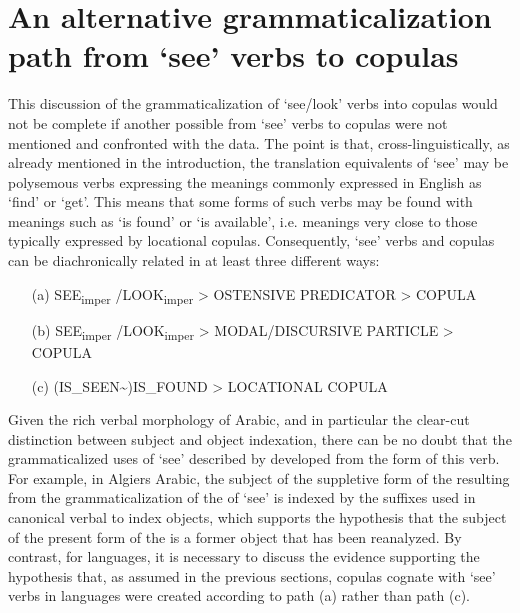 \documentclass[output=paper]{langsci/langscibook}
\begin{document}
\section{An alternative grammaticalization path from ‘see’ verbs to copulas}\label{sec:creissels:7} 

This discussion of the grammaticalization of ‘see\slash look’ verbs into copulas would not be complete if another possible  from ‘see’ verbs to copulas were not mentioned and confronted with the  data. The point is that, cross-linguistically, as already mentioned in the introduction, the translation equivalents of ‘see’ may be polysemous verbs expressing the meanings commonly expressed in English as ‘find’ or ‘get’. This means that some forms of such verbs may be found with meanings such as ‘is found’ or ‘is available’, i.e. meanings very close to those typically expressed by locational copulas. Consequently, ‘see’ verbs and copulas can be diachronically related in at least three different ways:

\begin{itemize}
 \item[(a)] SEE\textsubscript{imper} /LOOK\textsubscript{imper} > OSTENSIVE PREDICATOR > COPULA
 \item[(b)] SEE\textsubscript{imper} /LOOK\textsubscript{imper} > MODAL/DISCURSIVE PARTICLE > COPULA
 \item[(c)] (IS\_SEEN{\textasciitilde})IS\_FOUND > LOCATIONAL COPULA
\end{itemize}

Given the rich verbal morphology of Arabic, and in particular the clear-cut distinction between subject and object indexation, there can be no doubt that the grammaticalized uses of ‘see’ described by \citet{Taine-Cheikh2013} developed from the  form of this verb. For example, in Algiers Arabic, the subject of the suppletive form of the  resulting from the grammaticalization of the  of ‘see’ is indexed by the suffixes used in canonical verbal  to index objects, which supports the hypothesis that the subject of the present form of the  is a former object that has been reanalyzed. By contrast, for  languages, it is necessary to discuss the evidence supporting the hypothesis that, as assumed in the previous sections, copulas cognate with ‘see’ verbs in  languages were created according to path (a) rather than path (c).
\end{document}

